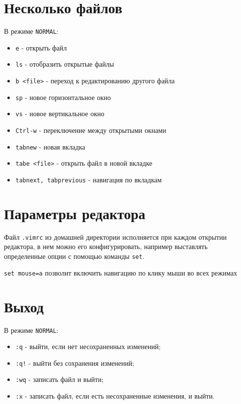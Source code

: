 \documentclass[12pt, a4paper]{article}
\begin{document}
\section{Несколько файлов}
В режиме \texttt{NORMAL}:
\begin{itemize}
  \item \texttt{e} - открыть файл
  \item \texttt{ls} - отобразить открытые файлы
  \item \texttt{b <file>} - переход к редактированию другого файла
  \item \texttt{sp} - новое горизонтальное окно
  \item \texttt{vs} - новое вертикальное окно
  \item \texttt{Ctrl-w} - переключение между открытыми окнами
  \item \texttt{tabnew} - новая вкладка
  \item \texttt{tabe <file>} - открыть файл в новой вкладке
  \item \texttt{tabnext, tabprevious} - навигация по вкладкам
\end{itemize}

\section{Параметры редактора}
Файл \texttt{.vimrc} из домашней директории исполняется при каждом открытии
редактора, в нем можно его конфигурировать, например выставлять определенные
опции с помощью команды \texttt{set}.

\texttt{set mouse=a} позволит включить навигацию по клику мыши во всех режимах
 
\section{Выход}
В режиме \texttt{NORMAL}:
\begin{itemize}
  \item \texttt{:q} - выйти, если нет несохраненных изменений;
  \item \texttt{:q!} - выйти без сохранения изменений;
  \item \texttt{:wq} - записать файл и выйти;
  \item \texttt{:x} - записать файл, если есть несохраненные изменения, и выйти.
\end{itemize}
\end{document}
